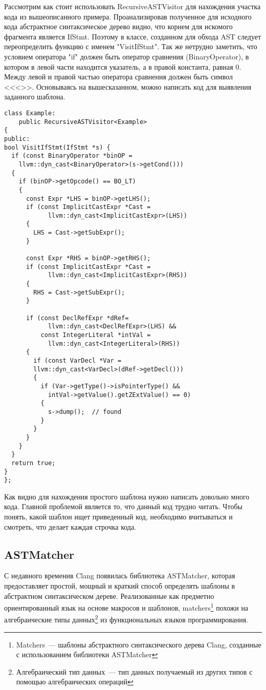 Рассмотрим как стоит использовать RecursiveASTVisitor для нахождения участка кода из вышеописанного
примера. Проанализировав полученное для исходного кода абстрактное синтаксическое дерево видно, что 
корнем для искомого фрагмента является IfStmt. Поэтому в классе, созданном для обхода AST
следует переопределить функцию с именем "VisitIfStmt". Так же нетрудно заметить, что условием 
оператора "if" должен быть оператор сравнения (BinaryOperator), в котором в левой части
находится указатель, а в правой константа, равная 0. Между левой и правой частью оператора сравнения
должен быть символ <<\textless>>. Основываясь на вышесказанном, можно написать код для выявления заданного шаблона.
\begin{lstlisting}
class Example:
	public RecursiveASTVisitor<Example> 
{
public:
bool VisitIfStmt(IfStmt *s) {
  if (const BinaryOperator *binOP =
    llvm::dyn_cast<BinaryOperator>(s->getCond())) 
  {
    if (binOP->getOpcode() == BO_LT) 
    {
      const Expr *LHS = binOP->getLHS();
      if (const ImplicitCastExpr *Cast =
            llvm::dyn_cast<ImplicitCastExpr>(LHS)) 
      {
        LHS = Cast->getSubExpr();
      }
      
      const Expr *RHS = binOP->getRHS();
      if (const ImplicitCastExpr *Cast =
            llvm::dyn_cast<ImplicitCastExpr>(RHS)) 
      {
        RHS = Cast->getSubExpr();
      } 

      if (const DeclRefExpr *dRef=
			llvm::dyn_cast<DeclRefExpr>(LHS) &&
		  const IntegerLiteral *intVal = 
			llvm::dyn_cast<IntegerLiteral>(RHS)) 
	  {
        if (const VarDecl *Var =
        llvm::dyn_cast<VarDecl>(dRef->getDecl())) 
        {
          if (Var->getType()->isPointerType() &&
            intVal->getValue().getZExtValue() == 0) 
          {
            s->dump();  // found
          }
        }
      }
    }
  }
  return true;
}
};
\end{lstlisting}

Как видно для нахождения простого шаблона нужно написать довольно много кода. Главной проблемой 
является то, что данный код трудно читать. Чтобы понять, какой шаблон ищет приведенный код,
необходимо вчитываться и смотреть, что делает каждая строчка кода. 


\subsection{ASTMatcher}
С недавного временив Clang появилась библиотека ASTMatcher, которая предоставляет простой, мощный и
краткий способ определять шаблоны в абстрактном синтаксическом дереве. Реализованные как
предметно ориентированный язык на основе макросов и шаблонов, matchers\footnote{Matchers~--- шаблоны абстрактного синтаксического дерева Clang, созданные с использованием библиотеки ASTMatcher} 
похожи на алгебраические типы данных\footnote{Алгебраический тип данных~--- тип данных получаемый из других типов с помощью алгебраических операций} 
из функциональных языков программирования.

